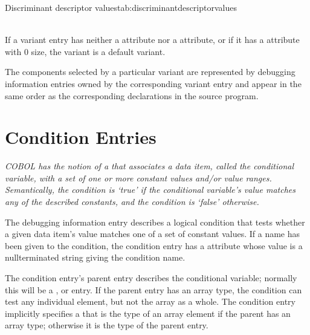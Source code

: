 \begin{simplenametable}[1.4in]{Discriminant descriptor values}{tab:discriminantdescriptorvalues}
\DWDSClabelTARG{} \\
\DWDSCrangeTARG{} \\
\end{simplenametable}

If a variant entry has neither a \DWATdiscrvalue{}
attribute nor a \DWATdiscrlist{} attribute, or if it has
a \DWATdiscrlist{} attribute with 0 size, the variant is a
default variant.

The components selected by a particular variant are represented
by debugging information entries owned by the corresponding
variant entry and appear in the same order as the corresponding
declarations in the source program.

\section{Condition Entries}
\label{chap:conditionentries}

\textit{COBOL has the notion of 
a  that
associates a data item, called the conditional variable, with
a set of one or more constant values and/or value ranges.
Semantically, the condition is \textquoteleft true\textquoteright{}
if the conditional
variable's value matches any of the described constants,
and the condition is \textquoteleft false\textquoteright{} otherwise.}

The \DWTAGconditionTARG{}
debugging information entry
describes a
logical condition that tests whether a given data item\textquoteright s
value matches one of a set of constant values. If a name
has been given to the condition, the condition entry has a
\DWATname{} attribute
whose value is a null\dash terminated string
giving the condition name.
\bbeb

The condition entry's parent entry describes the conditional
variable; normally this will be a \DWTAGvariable,
\DWTAGmember{} or 
\DWTAGformalparameter{} entry.
If 
the parent
entry has an array type, the condition can test any individual
element, but not the array as a whole. The condition entry
implicitly specifies a  that is the
type of an array element if the parent has an array type;
otherwise it is the type of the parent entry.

